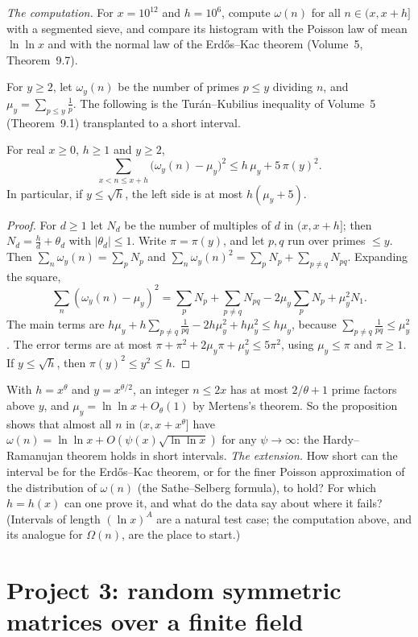 \emph{The computation.} For $x=10^{12}$ and $h=10^6$, compute $\omega(n)$ for all $n\in(x,x+h]$ with a segmented sieve, and compare its histogram with the Poisson law of mean $\ln\ln x$ and with the normal law of the Erd\H os--Kac theorem (Volume~5, Theorem~9.7).

For $y\ge2$, let $\omega_y(n)$ be the number of primes $p\le y$ dividing $n$, and $\mu_y=\sum_{p\le y}\frac1p$. The following is the Tur\'an--Kubilius inequality of Volume~5 (Theorem~9.1) transplanted to a short interval.

\begin{proposition}\label{prop:tkshort}
For real $x\ge0$, $h\ge1$ and $y\ge2$,
\[
\sum_{x<n\le x+h}\bigl(\omega_y(n)-\mu_y\bigr)^2\le h\,\mu_y+5\,\pi(y)^2.
\]
In particular, if $y\le\sqrt h$, the left side is at most $h(\mu_y+5)$.
\end{proposition}

\begin{proof}
For $d\ge1$ let $N_d$ be the number of multiples of $d$ in $(x,x+h]$; then $N_d=\frac hd+\theta_d$ with $|\theta_d|\le1$. Write $\pi=\pi(y)$, and let $p,q$ run over primes $\le y$. Then $\sum_n\omega_y(n)=\sum_pN_p$ and $\sum_n\omega_y(n)^2=\sum_pN_p+\sum_{p\ne q}N_{pq}$. Expanding the square,
\[
\sum_n(\omega_y(n)-\mu_y)^2=\sum_pN_p+\sum_{p\ne q}N_{pq}-2\mu_y\sum_pN_p+\mu_y^2N_1.
\]
The main terms are $h\mu_y+h\sum_{p\ne q}\frac1{pq}-2h\mu_y^2+h\mu_y^2\le h\mu_y$, because $\sum_{p\ne q}\frac1{pq}\le\mu_y^2$. The error terms are at most $\pi+\pi^2+2\mu_y\pi+\mu_y^2\le5\pi^2$, using $\mu_y\le\pi$ and $\pi\ge1$. If $y\le\sqrt h$, then $\pi(y)^2\le y^2\le h$.
\end{proof}

With $h=x^\theta$ and $y=x^{\theta/2}$, an integer $n\le2x$ has at most $2/\theta+1$ prime factors above $y$, and $\mu_y=\ln\ln x+O_\theta(1)$ by Mertens's theorem. So the proposition shows that almost all $n$ in $(x,x+x^\theta]$ have $\omega(n)=\ln\ln x+O(\psi(x)\sqrt{\ln\ln x})$ for any $\psi\to\infty$: the Hardy--Ramanujan theorem holds in short intervals. \emph{The extension.} How short can the interval be for the Erd\H os--Kac theorem, or for the finer Poisson approximation of the distribution of $\omega(n)$ (the Sathe--Selberg formula), to hold? For which $h=h(x)$ can one prove it, and what do the data say about where it fails? (Intervals of length $(\ln x)^A$ are a natural test case; the computation above, and its analogue for $\Omega(n)$, are the place to start.)

\section{Project 3: random symmetric matrices over a finite field}

